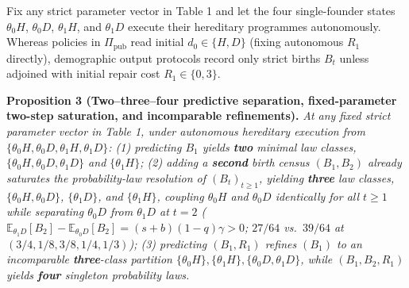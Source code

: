 \documentclass[12pt,letterpaper]{article}
\begin{document}
Fix any strict parameter vector in Table 1 and let the four
single-founder states \(\theta_0 H\), \(\theta_0 D\), \(\theta_1 H\),
and \(\theta_1 D\) execute their hereditary programmes autonomously.
Whereas policies in \(\Pi_{\mathrm{pub}}\) read initial
\(d_0 \in \{H, D\}\) (fixing autonomous \(R_1\) directly), demographic
output protocols record only strict births \(B_t\) unless adjoined with
initial repair cost \(R_1 \in \{0,3\}\).

\textbf{Proposition 3 (Two--three--four predictive separation,
fixed-parameter two-step saturation, and incomparable refinements).}
\emph{At any fixed strict parameter vector in Table 1, under autonomous
hereditary execution from
\(\{\theta_0 H, \theta_0 D, \theta_1 H, \theta_1 D\}\): (1) predicting
\(B_1\) yields \textbf{two} minimal law classes,
\(\{\theta_0 H, \theta_0 D, \theta_1 D\}\) and \(\{\theta_1 H\}\); (2)
adding a \textbf{second} birth census \((B_1, B_2)\) already saturates
the probability-law resolution of \((B_t)_{t\ge 1}\), yielding
\textbf{three} law classes, \(\{\theta_0 H, \theta_0 D\}\),
\(\{\theta_1 D\}\), and \(\{\theta_1 H\}\), coupling \(\theta_0 H\) and
\(\theta_0 D\) identically for all \(t \ge 1\) while separating
\(\theta_0 D\) from \(\theta_1 D\) at \(t=2\)
(\(\mathbb{E}_{\theta_1 D}[B_2] - \mathbb{E}_{\theta_0 D}[B_2] = (s+b)(1-q)\gamma > 0\);
\(27/64\) vs.~\(39/64\) at \((3/4,1/8,3/8,1/4,1/3)\)); (3) predicting
\((B_1, R_1)\) refines \((B_1)\) to an incomparable \textbf{three}-class
partition
\(\{\theta_0 H\}, \{\theta_1 H\}, \{\theta_0 D, \theta_1 D\}\), while
\((B_1, B_2, R_1)\) yields \textbf{four} singleton probability laws.}

\end{document}
